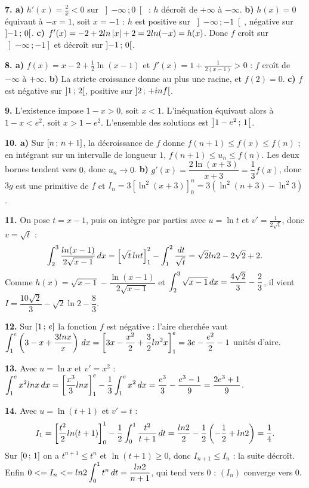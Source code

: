 \begin{corrige}[annales]
\textbf{7. a)} $h'(x) = \frac2x<0$ sur $\left]-\infty\,;0\right[$ : $h$ décroît
de $+\infty$ à $-\infty$.
\textbf{b)} $h(x) = 0$ équivaut à $-x = 1$, soit $x = -1$ : $h$ est positive
sur $\left]-\infty\,;-1\right[$, négative sur $\left]-1\,;\,0\right[$.
\textbf{c)} $f'(x) = -2+2ln\left|x\right|+2 = 2ln(-x) = h(x)$. Donc $f$ croît sur
$\left]-\infty\,;-1\right]$ et décroît sur $\left]-1\,;\,0\right[$.

\textbf{8. a)} $f(x) = x-2+\frac12\ln(x-1)$ et
$f'(x) = 1+\frac{1}{2(x-1)}>0$ : $f$ croît de $-\infty$ à $+\infty$.
\textbf{b)} La stricte croissance donne au plus une racine, et $f(2) = 0$.
\textbf{c)} $f$ est négative sur $\left]1\,;\,2\right[$, positive sur
$\left]2\,;\,+inf\right[$.

\textbf{9.} L'existence impose $1-x>0$, soit $x<1$. L'inéquation équivaut
alors à $1-x<e^{2}$, soit $x>1-e^{2}$. L'ensemble des solutions est
$\left]1-e^{2}\,;\,1\right[$.

\textbf{10. a)} Sur $\left[n\,;\,n+1\right]$, la décroissance de $f$ donne
$f(n+1) \leq f(x) \leq f(n)$ ; en intégrant sur un intervalle de longueur
$1$, $f(n+1) \leq u_{n} \leq f(n)$. Les deux bornes tendent vers $0$, donc
$u_{n}\to0$.
\textbf{b)} $g'(x) = \dfrac{2\ln(x+3)}{x+3} = \dfrac13 f(x)$, donc $3g$ est une
primitive de $f$ et
$I_{n} = 3\left[\ln^{2}(x+3)\right]_{0}^{n} = 3\left(\ln^{2}(n+3)-\ln^{2}3\right)$.

\textbf{11.} On pose $t = x-1$, puis on intègre par parties avec $u = \ln t$
et $v' = \frac{1}{2\sqrt t}$, donc $v = \sqrt t$ :
\[
  \int_{2}^{3}\frac{ln(x-1)}{2\sqrt{x-1}}\,dx
  = \left[\sqrt t\,ln t\right]_{1}^{2}-\int_{1}^{2}\frac{\,dt}{\sqrt t}
  = \sqrt2ln2-2\sqrt2+2 .
\]
Comme $h(x) = \sqrt{x-1}-\dfrac{\ln(x-1)}{2\sqrt{x-1}}$ et
$\displaystyle\int_{2}^{3}\sqrt{x-1}\,dx = \frac{4\sqrt2}{3}-\frac23$, il
vient $I = \dfrac{10\sqrt2}{3}-\sqrt2\ln2-\dfrac83$.

\textbf{12.} Sur $\left[1\,;\,e\right]$ la fonction $f$ est négative : l'aire
cherchée vaut $\displaystyle\int_{1}^{e}\left(3-x+\frac{3ln x}{x}\right)\,dx
= \left[3x-\frac{x^{2}}{2}+\frac32ln^{2}x\right]_{1}^{e}
= 3e-\frac{e^{2}}{2}-1$ unités d'aire.

\textbf{13.} Avec $u = \ln x$ et $v' = x^{2}$ :
$\displaystyle\int_{1}^{e}x^{2}ln x\,dx
= \left[\frac{x^{3}}{3}ln x\right]_{1}^{e}-\frac13\int_{1}^{e}x^{2}\,dx
= \frac{e^{3}}{3}-\frac{e^{3}-1}{9} = \frac{2e^{3}+1}{9}$.

\textbf{14.} Avec $u = \ln(t+1)$ et $v' = t$ :
\[
  I_{1} = \left[\frac{t^{2}}{2}ln(t+1)\right]_{0}^{1}
  -\frac12\int_{0}^{1}\frac{t^{2}}{t+1}\,dt
  = \frac{ln2}{2}-\frac12\left(-\frac12+ln2\right) = \frac14 .
\]
Sur $\left[0\,;\,1\right]$ on a $t^{n+1} \leq t^{n}$ et $\ln(t+1)\geq0$, donc
$I_{n+1} \leq I_{n}$ : la suite décroît. Enfin
$0 <= I_{n} <= ln2\displaystyle\int_{0}^{1}t^{n}\,dt = \frac{ln2}{n+1}$,
qui tend vers $0$ : $(I_{n})$ converge vers $0$.
\end{corrige}

